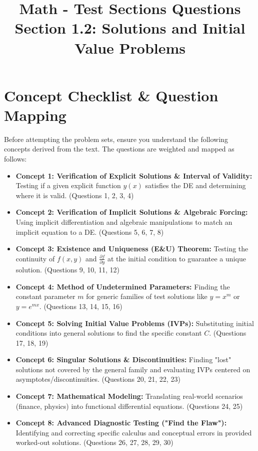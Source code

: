 \documentclass[12pt]{article}
\title{\textbf{Math - Test Sections Questions}\\
\large Section 1.2: Solutions and Initial Value Problems}
\author{}
\date{}
\begin{document}
\maketitle
\tableofcontents
\newpage

\section{Concept Checklist \& Question Mapping}
Before attempting the problem sets, ensure you understand the following concepts derived from the text. The questions are weighted and mapped as follows:

\begin{itemize}
    \item \textbf{Concept 1: Verification of Explicit Solutions \& Interval of Validity:} Testing if a given explicit function $y(x)$ satisfies the DE and determining where it is valid. (Questions 1, 2, 3, 4)
    \item \textbf{Concept 2: Verification of Implicit Solutions \& Algebraic Forcing:} Using implicit differentiation and algebraic manipulations to match an implicit equation to a DE. (Questions 5, 6, 7, 8)
    \item \textbf{Concept 3: Existence and Uniqueness (E\&U) Theorem:} Testing the continuity of $f(x,y)$ and $\frac{\partial f}{\partial y}$ at the initial condition to guarantee a unique solution. (Questions 9, 10, 11, 12)
    \item \textbf{Concept 4: Method of Undetermined Parameters:} Finding the constant parameter $m$ for generic families of test solutions like $y=x^m$ or $y=e^{mx}$. (Questions 13, 14, 15, 16)
    \item \textbf{Concept 5: Solving Initial Value Problems (IVPs):} Substituting initial conditions into general solutions to find the specific constant $C$. (Questions 17, 18, 19)
    \item \textbf{Concept 6: Singular Solutions \& Discontinuities:} Finding "lost" solutions not covered by the general family and evaluating IVPs centered on asymptotes/discontinuities. (Questions 20, 21, 22, 23)
    \item \textbf{Concept 7: Mathematical Modeling:} Translating real-world scenarios (finance, physics) into functional differential equations. (Questions 24, 25)
    \item \textbf{Concept 8: Advanced Diagnostic Testing ("Find the Flaw"):} Identifying and correcting specific calculus and conceptual errors in provided worked-out solutions. (Questions 26, 27, 28, 29, 30)
\end{itemize}
\end{document}
